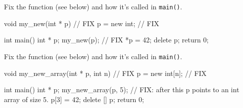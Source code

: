 

\nextq
Fix the function (see below) and how it's called in \verb!main()!.
\\
\ANSWER
\begin{answercode}
void my_new(int * p) // FIX
{
    p = new int; // FIX
}

int main()
{
    int * p;
    my_new(p); // FIX
    *p = 42;
    delete p;
    return 0;
}
\end{answercode}


\nextq
Fix the function (see below) and how it's called in \verb!main()!.
\\
\ANSWER
\begin{answercode}
void my_new_array(int * p, int n) // FIX
{
    p = new int[n]; // FIX
}

int main()
{
    int * p;
    my_new_array(p, 5); // FIX: after this p points to an int array of size 5.
    p[3] = 42;
    delete [] p;
    return 0;
}
\end{answercode}


